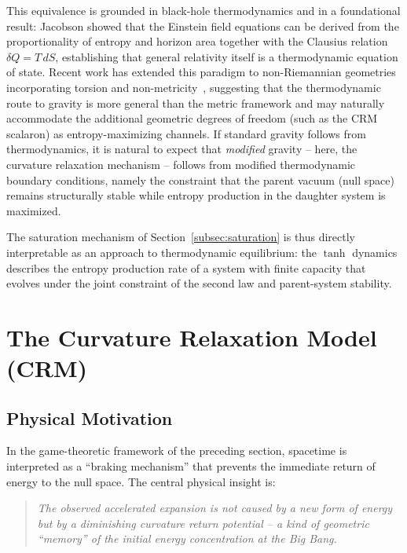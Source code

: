 \documentclass[aps,prd,twocolumn,superscriptaddress,nofootinbib]{revtex4-2}
\begin{document}
This equivalence is grounded in black-hole thermodynamics \cite{Hawking1974} and in a foundational result: Jacobson \cite{Jacobson1995} showed that the Einstein field equations can be derived from the proportionality of entropy and horizon area together with the Clausius relation $\delta Q = T\,dS$, establishing that general relativity itself is a thermodynamic equation of state. Recent work has extended this paradigm to non-Riemannian geometries incorporating torsion and non-metricity~\cite{JacobsonNonRiemannian2026}, suggesting that the thermodynamic route to gravity is more general than the metric framework and may naturally accommodate the additional geometric degrees of freedom (such as the CRM scalaron) as entropy-maximizing channels. If standard gravity follows from thermodynamics, it is natural to expect that \textit{modified} gravity -- here, the curvature relaxation mechanism -- follows from modified thermodynamic boundary conditions, namely the constraint that the parent vacuum (null space) remains structurally stable while entropy production in the daughter system is maximized.

The saturation mechanism of Section~\ref{subsec:saturation} is thus directly interpretable as an approach to thermodynamic equilibrium: the $\tanh$ dynamics describes the entropy production rate of a system with finite capacity that evolves under the joint constraint of the second law and parent-system stability.


\section{The Curvature Relaxation Model (CRM)}
\label{sec:crm}

\subsection{Physical Motivation}
\label{subsec:motivation}

In the game-theoretic framework of the preceding section, spacetime is interpreted as a ``braking mechanism'' that prevents the immediate return of energy to the null space. The central physical insight is:

\begin{quote}
\textit{The observed accelerated expansion is not caused by a new form of energy but by a diminishing curvature return potential -- a kind of geometric ``memory'' of the initial energy concentration at the Big Bang.}
\end{quote}
\end{document}
